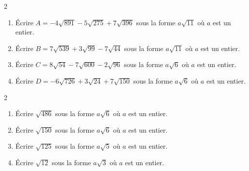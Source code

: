 {%
\begin{Exercice}
\leavevmode\vspace{-\baselineskip}
\vspace{-0.5cm}
\begin{multicols}{2}
\begin{enumerate}[itemsep=1em]
	\item \begin{minipage}[t]{\linewidth} Écrire $A=-4\sqrt{891} -5\sqrt{275} +7\sqrt{396}$ sous la forme $a\sqrt{11}$ où $a$ est un entier. \end{minipage}
	\item \begin{minipage}[t]{\linewidth} Écrire $B=7\sqrt{539} +3\sqrt{99} -7\sqrt{44}$ sous la forme $a\sqrt{11}$ où $a$ est un entier. \end{minipage}
	\item \begin{minipage}[t]{\linewidth} Écrire $C=8\sqrt{54} -7\sqrt{600} -2\sqrt{96}$ sous la forme $a\sqrt{6}$ où $a$ est un entier. \end{minipage}
	\item \begin{minipage}[t]{\linewidth} Écrire $D=-6\sqrt{726} +3\sqrt{24} +7\sqrt{150}$ sous la forme $a\sqrt{6}$ où $a$ est un entier. \end{minipage}
\end{enumerate}
\end{multicols}
\end{Exercice}

\begin{Exercice}
\leavevmode\vspace{-\baselineskip}
\vspace{-0.5cm}
\begin{multicols}{2}
\begin{enumerate}[itemsep=1em]
	\item \begin{minipage}[t]{\linewidth} Écrire $\sqrt{486}$ sous la forme $a\sqrt{6}$ où $a$ est un entier. \end{minipage}
	\item \begin{minipage}[t]{\linewidth} Écrire $\sqrt{150}$ sous la forme $a\sqrt{6}$ où $a$ est un entier. \end{minipage}
	\item \begin{minipage}[t]{\linewidth} Écrire $\sqrt{125}$ sous la forme $a\sqrt{5}$ où $a$ est un entier. \end{minipage}
	\item \begin{minipage}[t]{\linewidth} Écrire $\sqrt{12}$ sous la forme $a\sqrt{3}$ où $a$ est un entier. \end{minipage}
\end{enumerate}
\end{multicols}
\end{Exercice}

}
